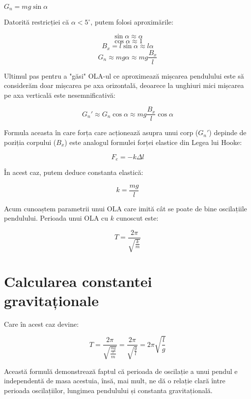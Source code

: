 \documentclass{article}
\begin{document}
\begin{math}
	G_n = mg\sin{\alpha}
\end{math}

Datorită restricției că $\alpha < 5^\circ$, putem folosi aproximările:

\begin{center}
	\[	\sin{\alpha} \approx \alpha	\]
	\[	\cos{\alpha} \approx 1		\]
	\[ B_x = l\sin{\alpha} \approx l\alpha	\]
	\[ G_n \approx mg\alpha \approx mg\frac{B_x}{l} \]
\end{center}

Ultimul pas pentru a "găsi" OLA-ul ce aproximează mișcarea pendulului este să
considerăm doar mișcarea pe axa orizontală, deoarece la unghiuri mici mișcarea
pe axa verticală este nesemnificativă:

\begin{center}
	\[ G_n' \approx G_n \cos{\alpha} \approx mg\frac{B_x}{l}\cos{\alpha} \]
\end{center}

Formula aceasta în care forța care acționează asupra unui corp ($G_n'$) depinde
de poziția corpului ($B_x$) este analogul formulei forței elastice din Legea lui
Hooke:
\begin{center}
        \[ F_e = -k\Delta l \]
\end{center}

În acest caz, putem deduce constanta elastică:

\begin{center}
        \[ k = \frac{mg}{l} \]
\end{center}

Acum cunoaștem parametrii unui OLA care imită cât se poate de bine oscilațiile
pendulului. Perioada unui OLA cu $k$ cunoscut este:

\begin{center}
	\[ T = \frac{2\pi}{\sqrt{\frac{k}{m}}} \]
\end{center}

\section{Calcularea constantei gravitaționale}

Care în acest caz devine:
\begin{center}
	\[ T = \frac{2\pi}{\sqrt{\frac{\frac{mg}{l}}{m}}} = \frac{2\pi}{\sqrt{\frac{g}{l}}} = 2\pi\sqrt{\frac{l}{g}} \]
\end{center}

Această formulă demonstrează faptul că perioada de oscilație a unui pendul
e independentă de masa acestuia, însă, mai mult, ne dă o relație clară între
perioada oscilațiilor, lungimea pendulului și constanta gravitațională.
\end{document}
